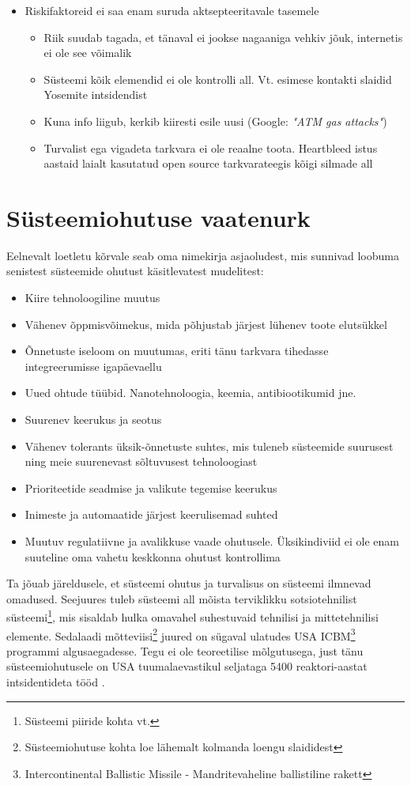 \documentclass{tufte-book}
\begin{document}
\begin{itemize}
		\item Riskifaktoreid ei saa enam suruda aktsepteeritavale tasemele
			\begin{itemize}
		\item Riik suudab tagada, et tänaval ei jookse nagaaniga vehkiv jõuk, internetis ei ole see võimalik
		\item Süsteemi kõik elemendid ei ole kontrolli all. Vt. esimese kontakti slaidid Yosemite intsidendist
		\item Kuna info liigub, kerkib kiiresti esile uusi (Google: \emph{"ATM gas attacks"})
		\item Turvalist ega vigadeta tarkvara ei ole reaalne toota. Heartbleed istus aastaid laialt kasutatud open source tarkvarateegis kõigi silmade all
	\end{itemize}

\end{itemize}

\section{Süsteemiohutuse vaatenurk}
Eelnevalt loetletu kõrvale seab \cite{leveson2011engineering} oma nimekirja asjaoludest, mis sunnivad loobuma senistest süsteemide ohutust käsitlevatest mudelitest:
\begin{itemize}
	\item Kiire tehnoloogiline muutus
	\item Vähenev õppmisvõimekus, mida põhjustab järjest lühenev toote elutsükkel
	\item Õnnetuste iseloom on muutumas, eriti tänu tarkvara tihedasse integreerumisse igapäevaellu
	\item Uued ohtude tüübid. Nanotehnoloogia, keemia, antibiootikumid jne.
	\item Suurenev keerukus ja seotus
	\item Vähenev tolerants üksik-õnnetuste suhtes, mis tuleneb süsteemide suurusest ning meie suurenevast sõltuvusest tehnoloogiast
	\item Prioriteetide seadmise ja valikute tegemise keerukus
	\item Inimeste ja automaatide järjest keerulisemad suhted
	\item Muutuv regulatiivne ja avalikkuse vaade ohutusele. Üksikindiviid ei ole enam suuteline oma vahetu keskkonna ohutust kontrollima
\end{itemize}

Ta jõuab järeldusele, et süsteemi ohutus ja turvalisus on süsteemi ilmnevad omadused. Seejuures tuleb süsteemi all mõista terviklikku sotsiotehnilist süsteemi\footnote{Süsteemi piiride kohta vt. }, mis sisaldab hulka omavahel suhestuvaid tehnilisi ja mittetehnilisi elemente. Sedalaadi mõtteviisi\footnote{Süsteemiohutuse kohta loe lähemalt kolmanda loengu slaididest} juured on sügaval ulatudes USA ICBM\footnote{Intercontinental Ballistic Missile - Mandritevaheline ballistiline rakett} programmi algusaegadesse. Tegu ei ole teoreetilise mõlgutusega, just tänu süsteemiohutusele on USA tuumalaevastikul seljataga 5400 reaktori-aastat intsidentideta tööd \cite{navy}. 
\end{document}
